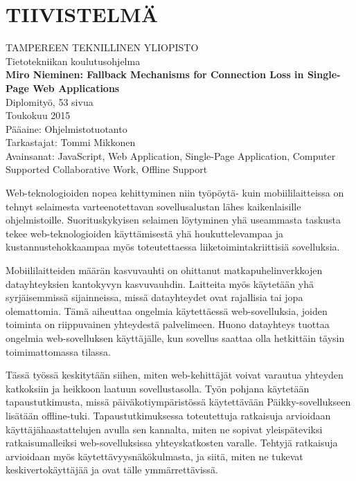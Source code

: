 \newpage
 
\setcounter{page}{1} %
 
\chapter*{TIIVISTELMÄ}
\begin{spacing}{1.0}
\textsf{TAMPEREEN TEKNILLINEN YLIOPISTO}\\
\textsf{Tietotekniikan koulutusohjelma}\\
{\bf \textsf{Miro Nieminen: Fallback Mechanisms for Connection Loss in Single-Page Web Applications}}\\
\textsf{Diplomityö, 53 sivua}\\
\textsf{Toukokuu 2015}\\
\textsf{Pääaine: Ohjelmistotuotanto}\\
\textsf{Tarkastajat: Tommi Mikkonen}\\
\textsf{Avainsanat: JavaScript, Web Application, Single-Page Application, Computer Supported Collaborative Work, Offline Support}\\
\end{spacing}
 
Web-teknologioiden nopea kehittyminen niin työpöytä- kuin mobiililaitteissa on tehnyt selaimesta varteenotettavan sovellusalustan lähes kaikenlaisille ohjelmistoille. Suorituskykyisen selaimen löytyminen yhä useammasta taskusta tekee web-tek\-no\-lo\-gi\-oi\-den käyttämisestä yhä houkuttelevampaa ja kustannustehokkaampaa myös toteutettaessa liiketoimintakriittisiä sovelluksia.

Mobiililaitteiden määrän kasvuvauhti on ohittanut matkapuhelinverkkojen datayhteyksien kan\-to\-ky\-vyn kasvuvauhdin. Laitteita myös käytetään yhä syrjäisemmissä sijainneissa, missä datayhteydet ovat rajallisia tai jopa olemattomia. Tämä aiheuttaa ongelmia käytettäessä web-sovelluksia, joiden toiminta on riippuvainen yhteydestä palvelimeen. Huono datayhteys tuottaa ongelmia web-sovelluksen käyttäjälle, kun sovellus saattaa olla hetkittäin täysin toimimattomassa tilassa.

Tässä työssä keskitytään siihen, miten web-kehittäjät voivat varautua yhteyden katkoksiin ja heikkoon laatuun sovellustasolla. Työn pohjana käytetään tapaustutkimusta, missä päiväkotiympäristössä käytettävään Päikky-sovellukseen lisätään offline-tuki. Tapaustutkimuksessa toteutettuja ratkaisuja arvioidaan käyttäjähaastattelujen avulla sen kannalta, miten ne sopivat yleispäteviksi ratkaisumalleiksi web-sovelluksissa yhteyskatkosten varalle. Tehtyjä ratkaisuja arvioidaan myös käytettävyysnäkökulmasta, ja siitä, miten ne tukevat keskivertokäyttäjää ja ovat tälle ymmärrettävissä.


